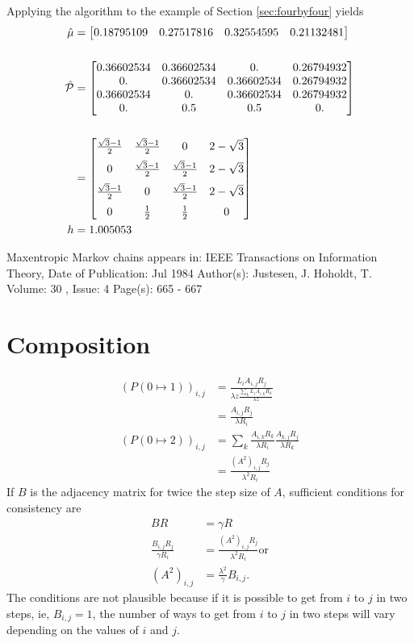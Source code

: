 \documentclass[12pt]{article} \usepackage{amsmath,amsfonts}
\newcommand{\T}{{\cal P}}
\begin{document}
Applying the algorithm to the example of Section \ref{sec:fourbyfour}
yields
\newcommand{\first}{\frac{\sqrt{3}-1}{2}}
\newcommand{\second}{2-\sqrt{3}}
\begin{align*}
  \hat \mu &=
  \begin{bmatrix}
     0.18795109  & 0.27517816 & 0.32554595 & 0.21132481
  \end{bmatrix} \\ \\
  \hat \T &=
  \begin{bmatrix}
 0.36602534 & 0.36602534 & 0. &         0.26794932  \\
  0. &         0.36602534 & 0.36602534 & 0.26794932 \\
  0.36602534 & 0. &         0.36602534 & 0.26794932 \\
  0. &         0.5 &        0.5 &        0.         
  \end{bmatrix} \\ \\
  &=
  \begin{bmatrix}
    \first & \first & 0      & \second \medskip \\
    0      & \first & \first & \second \medskip \\
    \first & 0      & \first & \second \medskip \\
    0      & \frac{1}{2} & \frac{1}{2} & 0
  \end{bmatrix} \\
  h &= 1.005053
\end{align*}

Maxentropic Markov chains appears in:
IEEE Transactions on Information Theory, 
Date of Publication: Jul 1984
Author(s): Justesen, J.
Hoholdt, T.
Volume: 30 , Issue: 4
Page(s): 665 - 667

\section{Composition}
\label{sec:composition}

\begin{align*}
  \left( P(0\mapsto 1) \right)_{i,j} &= \frac{L_i A_{i,j} R_j}
    {\lambda z \frac{\sum_k L_i A_{i,k} R_k}{\lambda z}} \\
  &= \frac{A_{i,j} R_j}{\lambda R_i} \\
  \left( P(0\mapsto 2) \right)_{i,j} &=
     \sum_k \frac{A_{i,k} R_k}{\lambda R_i}
            \frac{A_{k,j} R_j}{\lambda R_k} \\
  &= \frac{(A^2)_{i,j} R_j}{\lambda^2 R_i}                                       
\end{align*}
If $B$ is the adjacency matrix for twice the step size of $A$,
sufficient conditions for consistency are
\begin{align*}
  B R &= \gamma R \\
  \frac{B_{i,j} R_j}{\gamma R_i} &= \frac{(A^2)_{i,j} R_j}{\lambda^2
                                   R_i} \text{or}\\
  (A^2)_{i,j} &= \frac{\lambda^2}{\gamma} B_{i,j}.
\end{align*}
The conditions are not plausible because if it is possible to get from
$i$ to $j$ in two steps, ie, $B_{i,j}=1$, the number of ways to get
from $i$ to $j$ in two steps will vary depending on the values of $i$
and $j$.
\end{document}
